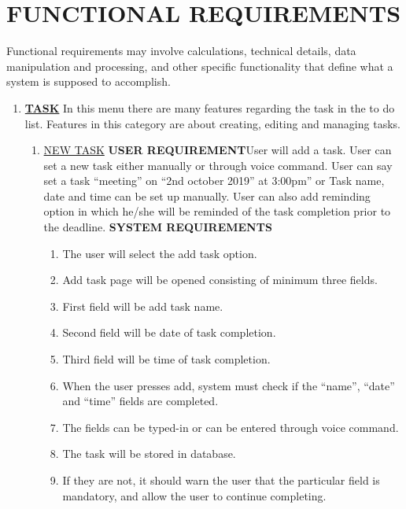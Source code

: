 \documentclass[12pt, a4paper]{report}
\begin{document}
\section{FUNCTIONAL REQUIREMENTS }
Functional requirements may involve calculations, technical details, data manipulation and processing, and other specific functionality that define what a system is supposed to accomplish.
\begin{enumerate}
	\item \textbf{\underline{TASK}} \newline In this menu there are many features regarding the task in the to do list. Features in this category are about creating, editing and managing tasks.  \newline  \begin{enumerate}\item \underline{NEW TASK} \newline \newline \textbf{USER REQUIREMENT}\newline  \newline User will add a task. User can set a new task either manually or through voice command. User can say set a task “meeting” on “2nd october 2019” at 3:00pm” or Task name, date and time can be set up manually. User can also add reminding option in which he/she will be reminded of the task completion prior to the deadline. \newline \newline \textbf{SYSTEM REQUIREMENTS}  
	\begin{enumerate}
	\item The user will select the add task option.
	\item Add task page will be opened consisting of minimum three fields.
	\item First field will be add task name.
	\item Second field will be date of task completion.
	\item Third field will be time of task completion.
	\item When the user presses add, system must check if the “name”, “date” and “time”  fields  are completed.
	\item The fields can be typed-in or can be entered through voice command.
	\item The task will be stored in database.
	\item  If they are not, it should warn the user that the particular field is mandatory, and allow the user to continue completing.
	\end{enumerate}


\end{enumerate}
\end{enumerate}
\end{document}
